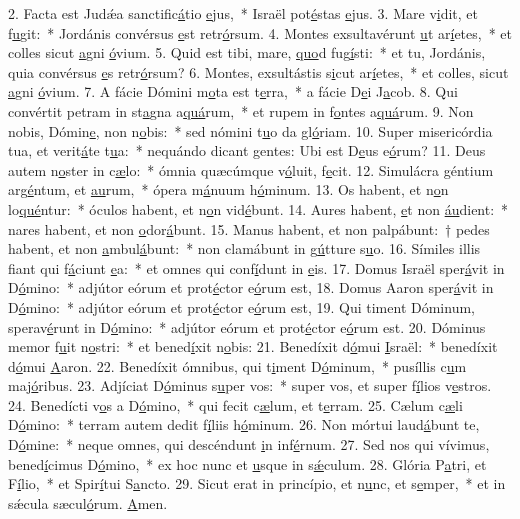 2. Facta est Judǽa sanctific\uline{á}tio \uline{e}jus,~* Israël pot\uline{é}stas \uline{e}jus.
3. Mare v\uline{i}dit, et f\uline{u}git:~* Jordánis convérsus \uline{e}st retr\uline{ó}rsum.
4. Montes exsultavérunt \uline{u}t ar\uline{í}etes,~* et colles sicut \uline{a}gni \uline{ó}vium.
5. Quid est tibi, mare, \uline{quo}d fug\uline{í}sti:~* et tu, Jordánis, quia convérsus \uline{e}s retr\uline{ó}rsum?
6. Montes, exsultástis s\uline{i}cut ar\uline{í}etes,~* et colles, sicut \uline{a}gni \uline{ó}vium.
7. A fácie Dómini m\uline{o}ta est t\uline{e}rra,~* a fácie D\uline{e}i J\uline{a}cob.
8. Qui convértit petram in st\uline{a}gna a\uline{quá}rum,~* et rupem in f\uline{o}ntes a\uline{quá}rum.
9. Non nobis, Dómin\uline{e}, non n\uline{o}bis:~* sed nómini t\uline{u}o da gl\uline{ó}riam.
10. Super misericórdia tua, et verit\uline{á}te t\uline{u}a:~* nequándo dicant gentes: Ubi est D\uline{e}us e\uline{ó}rum?
11. Deus autem n\uline{o}ster in c\uline{æ}lo:~* ómnia quæcúmque v\uline{ó}luit, f\uline{e}cit.
12. Simulácra géntium arg\uline{é}ntum, et \uline{au}rum,~* ópera m\uline{á}nuum h\uline{ó}minum.
13. Os habent, et n\uline{o}n lo\uline{qué}ntur:~* óculos habent, et n\uline{o}n vid\uline{é}bunt.
14. Aures habent, \uline{e}t non \uline{áu}dient:~* nares habent, et non \uline{o}dor\uline{á}bunt.
15. Manus habent, et non palpábunt:~† pedes habent, et non \uline{a}mbul\uline{á}bunt:~* non clamábunt in g\uline{ú}tture s\uline{u}o.
16. Símiles illis fiant qui f\uline{á}ciunt \uline{e}a:~* et omnes qui conf\uline{í}dunt in \uline{e}is.
17. Domus Israël sper\uline{á}vit in D\uline{ó}mino:~* adjútor eórum et prot\uline{é}ctor e\uline{ó}rum est,
18. Domus Aaron sper\uline{á}vit in D\uline{ó}mino:~* adjútor eórum et prot\uline{é}ctor e\uline{ó}rum est,
19. Qui timent Dóminum, sperav\uline{é}runt in D\uline{ó}mino:~* adjútor eórum et prot\uline{é}ctor e\uline{ó}rum est.
20. Dóminus memor f\uline{u}it n\uline{o}stri:~* et bened\uline{í}xit n\uline{o}bis:
21. Benedíxit d\uline{ó}mui \uline{I}sraël:~* benedíxit d\uline{ó}mui \uline{A}aron.
22. Benedíxit ómnibus, qui t\uline{i}ment D\uline{ó}minum,~* pusíllis c\uline{u}m maj\uline{ó}ribus.
23. Adjíciat D\uline{ó}minus s\uline{u}per vos:~* super vos, et super f\uline{í}lios v\uline{e}stros.
24. Benedícti v\uline{o}s a D\uline{ó}mino,~* qui fecit c\uline{æ}lum, et t\uline{e}rram.
25. Cælum c\uline{æ}li D\uline{ó}mino:~* terram autem dedit f\uline{í}liis h\uline{ó}minum.
26. Non mórtui laud\uline{á}bunt te, D\uline{ó}mine:~* neque omnes, qui descéndunt \uline{i}n inf\uline{é}rnum.
27. Sed nos qui vívimus, bened\uline{í}cimus D\uline{ó}mino,~* ex hoc nunc et \uline{u}sque in s\uline{ǽ}culum.
28. Glória P\uline{a}tri, et F\uline{í}lio,~* et Spir\uline{í}tui S\uline{a}ncto.
29. Sicut erat in princípio, et n\uline{u}nc, et s\uline{e}mper,~* et in sǽcula sæcul\uline{ó}rum. \uline{A}men.
